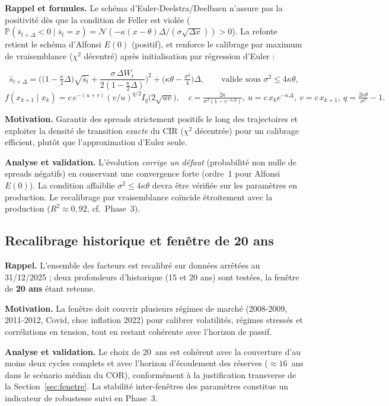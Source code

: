 \documentclass[11pt,a4paper]{article}
\begin{document}
\textbf{Rappel et formules.} Le schéma d'Euler-Deelstra/Deelbaen n'assure pas la positivité dès que la condition de Feller est violée ($\mathbb P(\bar s_{t+\Delta}<0\mid \bar s_t=x)=\mathcal N(-\kappa(x-\theta)\Delta/(\sigma\sqrt{\Delta x}))>0$). La refonte retient le schéma d'Alfonsi $E(0)$ (positif), et renforce le calibrage par maximum de vraisemblance ($\chi^2$ décentré) après initialisation par régression d'Euler :
\begin{definitionbox}
\[
\bar s_{t+\Delta}=\Big(\big(1-\tfrac{\kappa}{2}\Delta\big)\sqrt{\bar s_t}+\frac{\sigma\,\Delta W_t}{2(1-\tfrac{\kappa}{2}\Delta)}\Big)^{\!2}+\Big(\kappa\theta-\tfrac{\sigma^2}{4}\Big)\Delta,\qquad \text{valide sous } \sigma^2\le 4\kappa\theta,
\]
\[
f(x_{k+1}\mid x_k)=c\,e^{-(u+v)}(v/u)^{q/2}I_q\!\big(2\sqrt{uv}\big),\quad c=\tfrac{2\kappa}{\sigma^2(1-e^{-\kappa\Delta})},\ u=c\,x_k e^{-\kappa\Delta},\ v=c\,x_{k+1},\ q=\tfrac{2\kappa\theta}{\sigma^2}-1 .
\]
\end{definitionbox}

\textbf{Motivation.} Garantir des spreads strictement positifs le long des trajectoires et exploiter la densité de transition \emph{exacte} du CIR ($\chi^2$ décentrée) pour un calibrage efficient, plutôt que l'approximation d'Euler seule.

\textbf{Analyse et validation.} L'évolution \emph{corrige un défaut} (probabilité non nulle de spreads négatifs) en conservant une convergence forte (ordre~1 pour Alfonsi $E(0)$). La condition affaiblie $\sigma^2\le 4\kappa\theta$ devra être vérifiée sur les paramètres en production. Le recalibrage par vraisemblance coïncide étroitement avec la production ($R^2\approx0{,}92$, cf.\ Phase~3).

\subsection{Recalibrage historique et fenêtre de 20 ans}

\textbf{Rappel.} L'ensemble des facteurs est recalibré sur données arrêtées au 31/12/2025 ; deux profondeurs d'historique (15 et 20 ans) sont testées, la fenêtre de \textbf{20 ans} étant retenue.

\textbf{Motivation.} La fenêtre doit couvrir plusieurs régimes de marché (2008-2009, 2011-2012, Covid, choc inflation 2022) pour calibrer volatilités, régimes stressés et corrélations en tension, tout en restant cohérente avec l'horizon de passif.

\textbf{Analyse et validation.} Le choix de 20~ans est cohérent avec la couverture d'au moins deux cycles complets et avec l'horizon d'écoulement des réserves ($\approx16$~ans dans le scénario médian du COR), conformément à la justification transverse de la Section~\ref{sec:fenetre}. La stabilité inter-fenêtres des paramètres constitue un indicateur de robustesse suivi en Phase~3.
\end{document}
